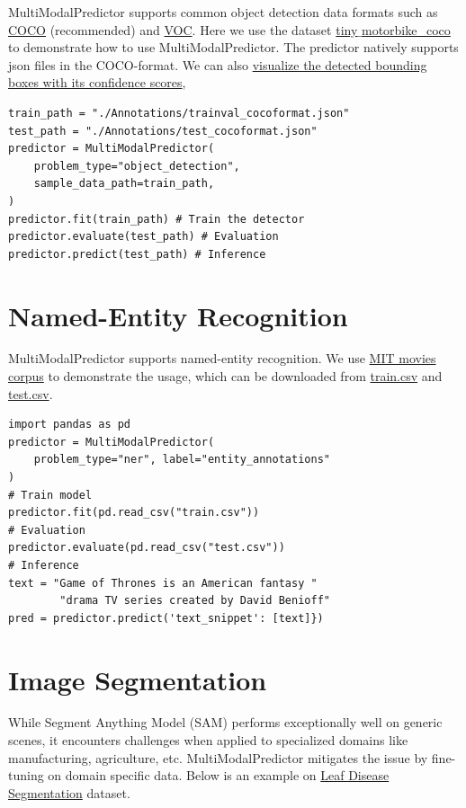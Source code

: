 MultiModalPredictor supports common object detection data formats such as \href{https://cocodataset.org/}{COCO} (recommended) and
\href{http://host.robots.ox.ac.uk/pascal/VOC/}{VOC}. Here we use the dataset \href{https://automl-mm-bench.s3.amazonaws.com/object_detection_dataset/tiny_motorbike_coco.zip}{tiny$\_$motorbike\_coco} to demonstrate how to use MultiModalPredictor. The predictor natively supports json files in the COCO-format.
We can also \href{https://auto.gluon.ai/stable/tutorials/multimodal/object_detection/quick_start/quick_start_coco.html}{visualize the detected bounding boxes with its confidence scores}, 

\begin{verbatim}
train_path = "./Annotations/trainval_cocoformat.json"
test_path = "./Annotations/test_cocoformat.json"
predictor = MultiModalPredictor(
    problem_type="object_detection",
    sample_data_path=train_path,
)
predictor.fit(train_path) # Train the detector
predictor.evaluate(test_path) # Evaluation
predictor.predict(test_path) # Inference
\end{verbatim}


\section*{Named-Entity Recognition}
MultiModalPredictor supports named-entity recognition. We use \href{https://groups.csail.mit.edu/sls/downloads/movie/}{MIT movies corpus} to demonstrate the usage, which can be downloaded from \href{https://automl-mm-bench.s3.amazonaws.com/ner/mit-movies/train.csv}{train.csv} and \href{https://automl-mm-bench.s3.amazonaws.com/ner/mit-movies/test.csv}{test.csv}.

\begin{verbatim}
import pandas as pd
predictor = MultiModalPredictor(
    problem_type="ner", label="entity_annotations"
)
# Train model
predictor.fit(pd.read_csv("train.csv"))
# Evaluation
predictor.evaluate(pd.read_csv("test.csv"))
# Inference
text = "Game of Thrones is an American fantasy "
        "drama TV series created by David Benioff" 
pred = predictor.predict('text_snippet': [text]})
\end{verbatim}

\section*{Image Segmentation}
While Segment Anything Model (SAM) performs exceptionally well on generic scenes, it encounters challenges when applied to specialized domains like manufacturing, agriculture, etc. 
MultiModalPredictor mitigates the issue by fine-tuning on domain specific data. Below is an example on \href{https://www.kaggle.com/datasets/sovitrath/leaf-disease-segmentation-with-trainvalid-split}{Leaf Disease Segmentation} dataset.

